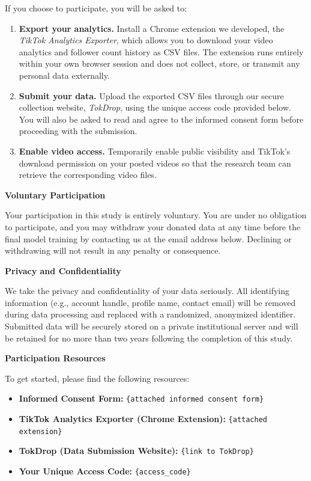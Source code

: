 If you choose to participate, you will be asked to:
\begin{enumerate}
    \item \textbf{Export your analytics.} Install a Chrome extension we developed, the \textit{TikTok Analytics Exporter}, which allows you to download your video analytics and follower count history as CSV files. The extension runs entirely within your own browser session and does not collect, store, or transmit any personal data externally.
    \item \textbf{Submit your data.} Upload the exported CSV files through our secure collection website, \textit{TokDrop}, using the unique access code provided below. You will also be asked to read and agree to the informed consent form before proceeding with the submission.
    \item \textbf{Enable video access.} Temporarily enable public visibility and TikTok's download permission on your posted videos so that the research team can retrieve the corresponding video files.
\end{enumerate}

\noindent\textbf{Voluntary Participation}

Your participation in this study is entirely voluntary. You are under no obligation to participate, and you may withdraw your donated data at any time before the final model training by contacting us at the email address below. Declining or withdrawing will not result in any penalty or consequence.

\noindent\textbf{Privacy and Confidentiality}

We take the privacy and confidentiality of your data seriously. All identifying information (e.g., account handle, profile name, contact email) will be removed during data processing and replaced with a randomized, anonymized identifier. Submitted data will be securely stored on a private institutional server and will be retained for no more than two years following the completion of this study.

\noindent\textbf{Participation Resources}

To get started, please find the following resources:
\begin{itemize}
    \item \textbf{Informed Consent Form:} \texttt{\{attached informed consent form\}}
    \item \textbf{TikTok Analytics Exporter (Chrome Extension):} \texttt{\{attached extension\}}
    \item \textbf{TokDrop (Data Submission Website):} \texttt{\{link to TokDrop\}}
    \item \textbf{Your Unique Access Code:} \texttt{\{access\_code\}}
\end{itemize}

